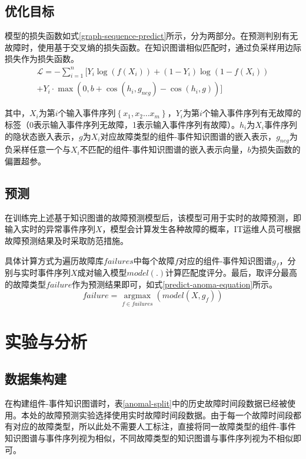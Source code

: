\subsection{优化目标}
模型的损失函数如式\ref{graph-sequence-predict}所示，分为两部分。在预测判别有无故障时，使用基于交叉熵的损失函数。在知识图谱相似匹配时，通过负采样用边际损失作为损失函数。
\begin{equation}
    \begin{aligned}
        \mathcal{L}=-\sum_{i=1}^{n}[Y_{i} \log \left(f\left(X_{i} \right)\right)
        +\left(1-Y_{i}\right) \log \left(1-f\left(X_{i} \right)\right)\\
+Y_{i}\cdot \max \left (0, b +\cos \left (h_{i},  g_{neg} \right ) - \cos \left (h_{i}, g \right )\right )]
    \end{aligned}
    \label{graph-sequence-predict}
\end{equation}

其中，$X_{i}$为第$i$个输入事件序列$\left\{x_{1}, x_{2} \ldots x_{m}\right\}$，$Y_{i}$为第$i$个输入事件序列有无故障的标签（0表示输入事件序列无故障，1表示输入事件序列有故障）。$h_{i}$为$X_{i}$事件序列的隐状态嵌入表示，$g$为$X_{i}$对应故障类型的组件-事件知识图谱的嵌入表示，$g_{neg}$为负采样任意一个与$X_{i}$不匹配的组件-事件知识图谱的嵌入表示向量，$b$为损失函数的偏置超参。

\subsection{预测}
在训练完上述基于知识图谱的故障预测模型后，该模型可用于实时的故障预测，即输入实时的异常事件序列$X$，模型会计算发生各种故障的概率，IT运维人员可根据故障预测结果及时采取防范措施。

具体计算方式为遍历故障库$failures$中每个故障$f$对应的组件-事件知识图谱$g_f$，分别与实时事件序列$X$成对输入模型$model(.)$计算匹配度评分。最后，取评分最高的故障类型$failure$作为预测结果即可，如式\ref{predict-anoma-equation}所示。
\begin{equation}
    failure = \mathop{\arg\max}\limits_{f\in failures}( model ( X, g_f)) 
    \label{predict-anoma-equation}   
\end{equation}
\section{实验与分析}
\subsection{数据集构建}
在构建组件-事件知识图谱时，表\ref{anomal-split}中的历史故障时间段数据已经被使用。本处的故障预测实验选择使用实时故障时间段数据。由于每一个故障时间段都有对应的故障类型，所以此处不需要人工标注，直接将同一故障类型的组件-事件知识图谱与事件序列视为相似，不同故障类型的知识图谱与事件序列视为不相似即可。

